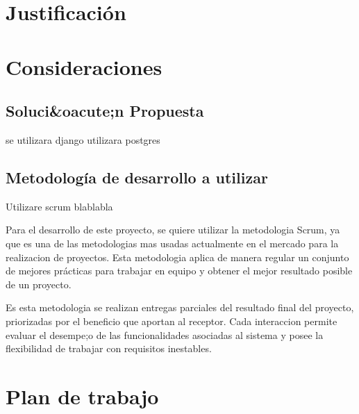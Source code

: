 \section{Justificación}


\section{Consideraciones}


\subsection{Soluci&oacute;n Propuesta}

se utilizara django
utilizara postgres

\subsection{Metodología de desarrollo a utilizar}

Utilizare scrum blablabla

Para el desarrollo de este proyecto, se quiere utilizar la metodologia Scrum, ya que es una de las metodologias mas usadas actualmente en el mercado para la realizacion de proyectos. Esta metodologia aplica de manera regular un conjunto de mejores prácticas para trabajar en equipo y obtener el mejor resultado posible de un proyecto.

Es esta metodologia se realizan entregas parciales del resultado final del proyecto, priorizadas por el beneficio que aportan al receptor. Cada interaccion permite evaluar el desempe;o de las funcionalidades asociadas al sistema y posee la flexibilidad de trabajar con requisitos inestables.









\section{Plan de trabajo}
